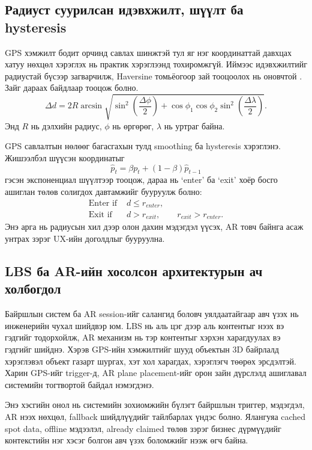\begin{sloppy}
\subsection{Радиуст суурилсан идэвхжилт, шүүлт ба hysteresis}

GPS хэмжилт бодит орчинд савлах шинжтэй тул яг нэг координаттай давхцах хатуу нөхцөл хэрэглэх нь практик хэрэглээнд тохиромжгүй. Иймээс идэвхжилтийг радиустай бүсээр загварчилж, Haversine томьёогоор зай тооцоолох нь оновчтой \cite{Kaplan2006}. Зайг дараах байдлаар тооцож болно.
\[
\Delta d = 2R \arcsin \sqrt{\sin^2\left(\frac{\Delta \phi}{2}\right) + \cos \phi_1 \cos \phi_2 \sin^2\left(\frac{\Delta \lambda}{2}\right)}.
\]
Энд $R$ нь дэлхийн радиус, $\phi$ нь өргөрөг, $\lambda$ нь уртраг байна.

GPS савлалтын нөлөөг багасгахын тулд smoothing ба hysteresis хэрэглэнэ. Жишээлбэл шүүсэн координатыг
\[
\hat{p}_t = \beta p_t + (1-\beta)\hat{p}_{t-1}
\]
гэсэн экспоненциал шүүлтээр тооцож, дараа нь `enter' ба `exit' хоёр босго ашиглан төлөв солигдох давтамжийг бууруулж болно:
\begin{align}
\text{Enter if } & d \le r_{enter}, \\
\text{Exit if } & d > r_{exit}, \qquad r_{exit} > r_{enter}.
\end{align}
Энэ арга нь радиусын хил дээр олон дахин мэдэгдэл үүсэх, AR товч байнга асаж унтрах зэрэг UX-ийн доголдлыг бууруулна.

\subsection{LBS ба AR-ийн хосолсон архитектурын ач холбогдол}

Байршлын систем ба AR session-ийг салангид боловч уялдаатайгаар авч үзэх нь инженерийн чухал шийдвэр юм. LBS нь аль цэг дээр аль контентыг нээх вэ гэдгийг тодорхойлж, AR механизм нь тэр контентыг хэрхэн харагдуулах вэ гэдгийг шийднэ. Хэрэв GPS-ийн хэмжилтийг шууд объектын 3D байрлалд хэрэглэвэл объект газарт шургах, хэт хол харагдах, хэрэглэгч төөрөх эрсдэлтэй. Харин GPS-ийг trigger-д, AR plane placement-ийг орон зайн дүрслэлд ашиглавал системийн тогтвортой байдал нэмэгдэнэ.

Энэ хэсгийн онол нь системийн зохиомжийн бүлэгт байршлын триггер, мэдэгдэл, AR нээх нөхцөл, fallback шийдлүүдийг тайлбарлах үндэс болно. Ялангуяа cached spot data, offline мэдээлэл, already claimed төлөв зэрэг бизнес дүрмүүдийг контекстийн нэг хэсэг болгон авч үзэх боломжийг нээж өгч байна.


\end{sloppy}
